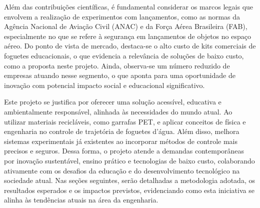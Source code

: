 Além das contribuições científicas, é fundamental considerar os marcos legais que envolvem a realização de experimentos com lançamentos, como as normas da Agência Nacional de Aviação Civil (ANAC) e da Força Aérea Brasileira (FAB), especialmente no que se refere à segurança em lançamentos de objetos no espaço aéreo. Do ponto de vista de mercado, destaca-se o alto custo de kits comerciais de foguetes educacionais, o que evidencia a relevância de soluções de baixo custo, como a proposta neste projeto. Ainda, observa-se um número reduzido de empresas atuando nesse segmento, o que aponta para uma oportunidade de inovação com potencial impacto social e educacional significativo.

Este projeto se justifica por oferecer uma solução acessível, educativa e ambientalmente responsável, alinhada às necessidades do mundo atual. Ao utilizar materiais recicláveis, como garrafas PET, e aplicar conceitos de física e engenharia no controle de trajetória de foguetes d’água. Além disso, melhora sistemas experimentais já existentes ao incorporar métodos de controle mais precisos e seguros. Dessa forma, o projeto atende a demandas contemporâneas por inovação sustentável, ensino prático e tecnologias de baixo custo, colaborando ativamente com os desafios da educação e do desenvolvimento tecnológico na sociedade atual. Nas seções seguintes, serão detalhadas a metodologia adotada, os resultados esperados e os impactos previstos, evidenciando como esta iniciativa se alinha às tendências atuais na área da engenharia.







